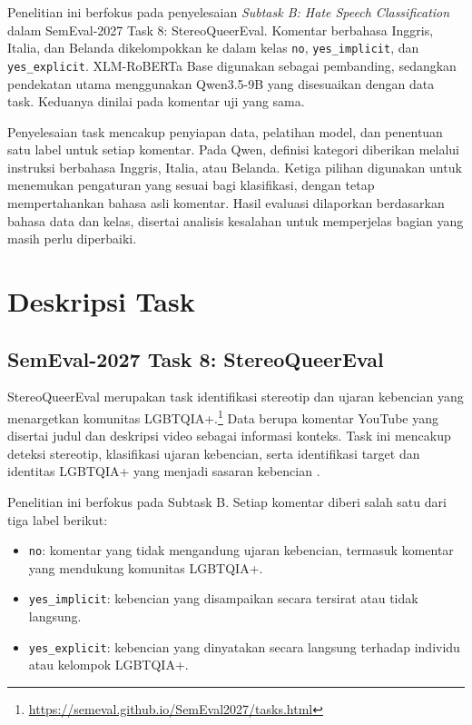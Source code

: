 \documentclass[11pt]{article}
\begin{document}
Penelitian ini berfokus pada penyelesaian \textit{Subtask B: Hate Speech Classification} dalam SemEval-2027 Task 8: StereoQueerEval. Komentar berbahasa Inggris, Italia, dan Belanda dikelompokkan ke dalam kelas \texttt{no}, \texttt{yes\_implicit}, dan \texttt{yes\_explicit}. XLM-RoBERTa Base digunakan sebagai pembanding, sedangkan pendekatan utama menggunakan Qwen3.5-9B yang disesuaikan dengan data task. Keduanya dinilai pada komentar uji yang sama.

Penyelesaian task mencakup penyiapan data, pelatihan model, dan penentuan satu label untuk setiap komentar. Pada Qwen, definisi kategori diberikan melalui instruksi berbahasa Inggris, Italia, atau Belanda. Ketiga pilihan digunakan untuk menemukan pengaturan yang sesuai bagi klasifikasi, dengan tetap mempertahankan bahasa asli komentar. Hasil evaluasi dilaporkan berdasarkan bahasa data dan kelas, disertai analisis kesalahan untuk memperjelas bagian yang masih perlu diperbaiki.

\section{Deskripsi Task}
\subsection{SemEval-2027 Task 8: StereoQueerEval}
\label{sec:task}
StereoQueerEval merupakan task identifikasi stereotip dan ujaran kebencian yang menargetkan komunitas LGBTQIA+.\footnote{\url{https://semeval.github.io/SemEval2027/tasks.html}} Data berupa komentar YouTube yang disertai judul dan deskripsi video sebagai informasi konteks. Task ini mencakup deteksi stereotip, klasifikasi ujaran kebencian, serta identifikasi target dan identitas LGBTQIA+ yang menjadi sasaran kebencian \citep{stereoqueereval-2026-data}.

Penelitian ini berfokus pada Subtask B. Setiap komentar diberi salah satu dari tiga label berikut:
\begin{itemize}
    \item \texttt{no}: komentar yang tidak mengandung ujaran kebencian, termasuk komentar yang mendukung komunitas LGBTQIA+.
    \item \texttt{yes\_implicit}: kebencian yang disampaikan secara tersirat atau tidak langsung.
    \item \texttt{yes\_explicit}: kebencian yang dinyatakan secara langsung terhadap individu atau kelompok LGBTQIA+.
\end{itemize}
\end{document}
